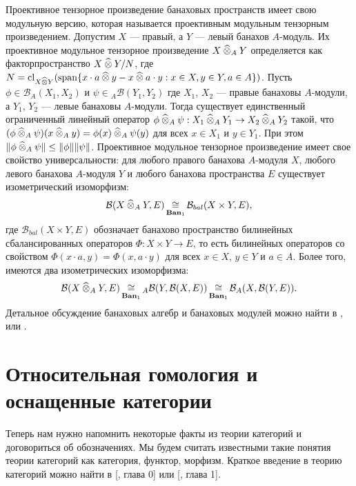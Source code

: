 Проективное тензорное произведение банаховых пространств имеет свою модульную версию, которая называется проективным модульным тензорным произведением. Допустим $X$ --- правый, а $Y$ --- левый банахов $A$-модуль. Их проективное модульное тензорное произведение  $X\mathbin{\widehat{\otimes}}_{A}Y$ определяется как факторпространство $X\mathbin{\widehat{\otimes}} Y / N$, где $N=\operatorname{cl}_{X\mathbin{\widehat{\otimes}} Y}(\operatorname{span}\{x\cdot a\mathbin{\widehat{\otimes}} y-x\mathbin{\widehat{\otimes}} a\cdot y:x\in X,y\in Y,a\in A\})$. Пусть $\phi\in\mathcal{B}_A(X_1,X_2)$ и $\psi\in{}_A\mathcal{B}(Y_1,Y_2)$ где $X_1$, $X_2$ --- правые банаховы $A$-модули, а $Y_1$, $Y_2$ --- левые банаховы $A$-модули. Тогда существует единственный ограниченный линейный оператор $\phi\mathbin{\widehat{\otimes}}_{A} \psi:X_1\mathbin{\widehat{\otimes}}_{A} Y_1\to X_2\mathbin{\widehat{\otimes}}_{A} Y_2$ такой, что $(\phi\mathbin{\widehat{\otimes}}_{A} \psi)(x\mathbin{\widehat{\otimes}}_{A} y)=\phi(x)\mathbin{\widehat{\otimes}}_{A} \psi(y)$ для всех $x\in X_1$ и $y\in Y_1$. При этом $\Vert \phi\mathbin{\widehat{\otimes}}_{A} \psi\Vert\leq\Vert \phi\Vert\Vert \psi\Vert$. Проективное модульное тензорное произведение имеет свое свойство универсальности: для любого правого банахова $A$-модуля $X$, любого левого банахова $A$-модуля $Y$ и любого банахова пространства $E$ существует изометрический изоморфизм:
$$
\mathcal{B}(X\mathbin{\widehat{\otimes}}_{A}Y,E)\mathop{\mathbin{\cong}}\limits_{\mathbf{Ban}_1}\mathcal{B}_{bal}(X\times Y, E),
$$
где $\mathcal{B}_{bal}(X\times Y, E)$ обозначает банахово пространство билинейных сбалансированных операторов $\Phi:X\times Y\to E$, то есть билинейных операторов со свойством $\Phi(x\cdot a,y)=\Phi(x,a\cdot y)$ для всех $x\in X$, $y\in Y$ и $a\in A$. Более того, имеются два изометрических изоморфизма:
$$
\mathcal{B}(X\mathbin{\widehat{\otimes}}_{A}Y,E)
\mathop{\mathbin{\cong}}\limits_{\mathbf{Ban}_1}
{}_A\mathcal{B}(Y,\mathcal{B}(X,E))
\mathop{\mathbin{\cong}}\limits_{\mathbf{Ban}_1}
\mathcal{B}_A(X,\mathcal{B}(Y,E)).
$$
Детальное обсуждение банаховых алгебр и банаховых модулей можно найти в \cite{HelBanLocConvAlg}, \cite{HelHomolBanTopAlg} или \cite{DalBanAlgAutCont}.


\section{Относительная гомология и оснащенные категории}
\label{SectionRelativeHomologyAndRiggedCategories}

Теперь нам нужно напомнить некоторые факты из теории категорий и договориться об обозначениях. Мы будем считать известными такие понятия теории категорий как категория, функтор, морфизм. Краткое  введение в теорию категорий можно найти в [\cite{HelLectAndExOnFuncAn}, глава 0] или [\cite{KashivShapCatsAndSheavs}, глава 1].

